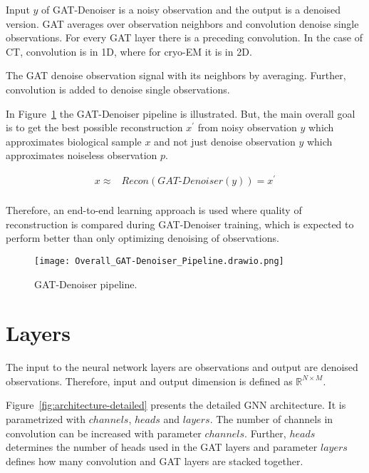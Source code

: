 
Input $y$ of GAT-Denoiser is a noisy observation and the output is a denoised version.
GAT averages over observation neighbors and convolution denoise single observations. 
For every GAT layer there is a preceding convolution. 
In the case of CT, convolution is in 1D, where for cryo-EM it is in 2D.

\begin{tcolorbox}[colback=red!5!white,colframe=red!75!black]
  The GAT denoise observation signal with its neighbors by averaging. 
  Further, convolution is added to denoise single observations.
\end{tcolorbox}

In Figure~\ref{fig:overall-concept} the GAT-Denoiser pipeline is illustrated.
But, the main overall goal is to get the best possible reconstruction $x^{\prime}$ 
from noisy observation $y$ which approximates biological sample $x$ and 
not just denoise observation $y$ which approximates noiseless observation $p$.


\begin{equation}
  \begin{aligned}
    x \approx   &\textit{Recon} \left( \textit{GAT-Denoiser} \left( y \right) \right) = x^{\prime} \\
  \end{aligned}
\end{equation}

Therefore, an end-to-end learning approach is used where quality of reconstruction is 
compared during GAT-Denoiser training, which is expected to perform better than 
only optimizing denoising of observations.

\begin{figure}[H]
  \centering
  \texttt{[image: Overall\_GAT-Denoiser\_Pipeline.drawio.png]}
  \caption{GAT-Denoiser pipeline.}
  \label{fig:overall-concept}
\end{figure}


\section{Layers}
The input to the neural network layers are observations and output are denoised observations.
Therefore, input and output dimension is defined as  $\mathbb{R}^{N \times M}$. 

Figure~\ref{fig:architecture-detailed} presents the detailed GNN architecture.
It is parametrized with $channels$, $heads$ and $layers$. 
The number of channels in convolution can be increased with parameter $channels$.
Further, $heads$ determines the number of heads used in the GAT layers and parameter 
$layers$ defines how many convolution and GAT layers are stacked together.

